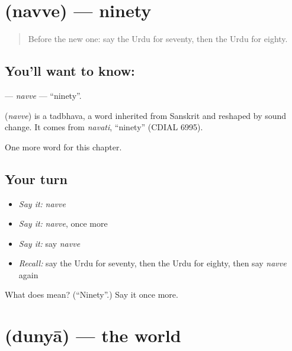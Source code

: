 \section[\texorpdfstring{\ur{نوے} (navve)}{نوے (navve)}]{ (navve) — ninety}

\label{lesson:UR-C86-navve}



\begin{quote}
Before the new one: say the Urdu for seventy, then the Urdu for eighty.
\end{quote}

\subsection*{You'll want to know: }
\textbf{} — \emph{navve} — \textquotedblleft{}ninety\textquotedblright{}.

\begin{cousinweb}
\textbf{} (\emph{navve}) is a tadbhava, a word inherited from Sanskrit and reshaped by sound change. It comes from \emph{navati}, \textquotedblleft{}ninety\textquotedblright{} (CDIAL 6995).
\end{cousinweb}

\begin{grammarlens}[title={What you've built}]
One more word for this chapter.
\end{grammarlens}

\subsection*{Your turn}
\begin{itemize}
\raggedright
  \item \emph{Say it:} \emph{navve}
  \item \emph{Say it:} \emph{navve}, once more
  \item \emph{Say it:} say \emph{navve}
  \item \emph{Recall:} say the Urdu for seventy, then the Urdu for eighty, then say \emph{navve} again
\end{itemize}

\begin{tcolorbox}[breakable,colback=teal!4,colframe=teal!35!black,title={Before you move on}]
What does  mean? (\textquotedblleft{}Ninety\textquotedblright{}.) Say it once more.
\end{tcolorbox}
\section[\texorpdfstring{\ur{دنیا} (dunyā)}{دنیا (dunyā)}]{ (dunyā) — the world}

